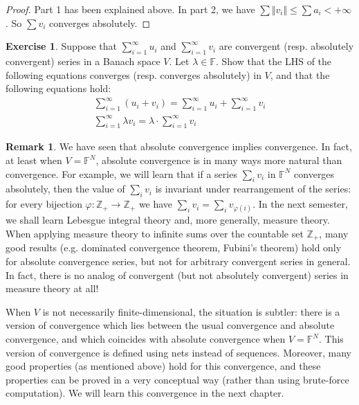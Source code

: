 \documentclass[12pt,b5paper,notitlepage]{article}
\theoremstyle{definition}
\newtheorem{exe}[df]{Exercise}
\newtheorem{rem}[df]{Remark}
\theoremstyle{plain}
\newcommand{\Zbb}{\mathbb Z}
\newcommand{\Fbb}{\mathbb F}
\numberwithin{equation}{section}
\begin{document}
\begin{proof}
Part 1 has been explained above. In part 2, we have $\sum\Vert v_i\Vert \leq \sum a_i<+\infty$. So $\sum v_i$ converges absolutely.
\end{proof}


\begin{exe}
Suppose that $\sum_{i=1}^\infty u_i$ and $\sum_{i=1}^\infty v_i$ are convergent (resp. absolutely convergent) series in a Banach space $V$. Let $\lambda\in\Fbb$. Show that the LHS of the following equations converges (resp. converges absolutely) in $V$, and that the following equations hold:
\begin{gather*}
\sum_{i=1}^\infty (u_i+v_i)=\sum_{i=1}^\infty u_i+\sum_{i=1}^\infty v_i\\
\sum_{i=1}^\infty \lambda v_i=\lambda\cdot\sum_{i=1}^\infty v_i
\end{gather*}
\end{exe}


\begin{rem}
We have seen that absolute convergence implies convergence. In fact, at least when $V=\Fbb^N$, absolute convergence is in many ways more natural than convergence. For example, we will learn that if a series $\sum_i v_i$ in $\Fbb^N$ converges absolutely, then the value of $\sum_i v_i$ is invariant under rearrangement of the series: for every bijection $\varphi:\Zbb_+\rightarrow\Zbb_+$ we have $\sum_i v_i=\sum_i v_{\varphi(i)}$. In the next semester, we shall learn Lebesgue integral theory and, more generally, measure theory. When applying measure theory to infinite sums over the countable set $\Zbb_+$, many good results (e.g. dominated convergence theorem, Fubini's theorem)  hold only for absolute convergence series, but not for arbitrary convergent series in general. In fact, there is no analog of convergent (but not absolutely convergent) series in measure theory at all!

When $V$ is not necessarily finite-dimensional, the situation is subtler: there is a version of convergence which lies between the usual convergence and absolute convergence, and which coincides with absolute convergence when $V=\Fbb^N$. This version of convergence is defined using nets instead of sequences. Moreover, many good properties (as mentioned above) hold for this convergence, and these properties can be proved in a very conceptual way (rather than using brute-force computation). We will learn this convergence in the next chapter.   \hfill\qedsymbol
\end{rem}
\end{document}
